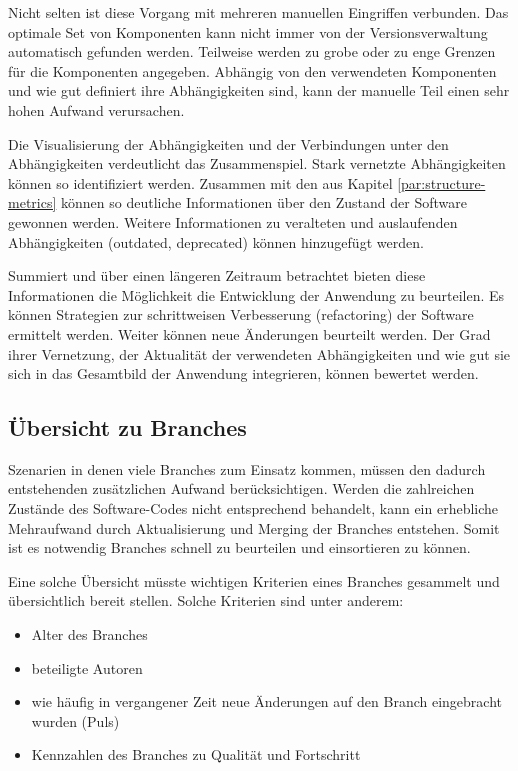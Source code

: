 Nicht selten ist diese Vorgang mit mehreren manuellen Eingriffen verbunden. Das optimale Set von Komponenten kann nicht immer von der Versionsverwaltung automatisch gefunden werden. Teilweise werden zu grobe oder zu enge Grenzen für die Komponenten angegeben. Abhängig von den verwendeten Komponenten und wie gut definiert ihre Abhängigkeiten sind, kann der manuelle Teil einen sehr hohen Aufwand verursachen.

Die Visualisierung der Abhängigkeiten und der Verbindungen unter den Abhängigkeiten verdeutlicht das Zusammenspiel. Stark vernetzte Abhängigkeiten können so identifiziert werden. Zusammen mit den  aus Kapitel \ref{par:structure-metrics} können so deutliche Informationen über den Zustand der Software gewonnen werden. Weitere Informationen zu veralteten und auslaufenden Abhängigkeiten (outdated, deprecated) können hinzugefügt werden.

Summiert und über einen längeren Zeitraum betrachtet bieten diese Informationen die Möglichkeit die Entwicklung der Anwendung zu beurteilen. Es können Strategien zur schrittweisen Verbesserung (refactoring) der Software ermittelt werden. Weiter können neue Änderungen beurteilt werden. Der Grad ihrer Vernetzung, der Aktualität der verwendeten Abhängigkeiten und wie gut sie sich in das Gesamtbild der Anwendung integrieren, können bewertet werden.

\subsection{Übersicht zu Branches}

Szenarien in denen viele Branches zum Einsatz kommen, müssen den dadurch entstehenden zusätzlichen Aufwand berücksichtigen. Werden die zahlreichen Zustände des Software-Codes nicht entsprechend behandelt, kann ein erhebliche Mehraufwand durch Aktualisierung und Merging der Branches entstehen. Somit ist es notwendig Branches schnell zu beurteilen und einsortieren zu können.

Eine solche Übersicht müsste wichtigen Kriterien eines Branches gesammelt und übersichtlich bereit stellen. Solche Kriterien sind unter anderem:
\begin{itemize}
\item Alter des Branches
\item beteiligte Autoren
\item wie häufig in vergangener Zeit neue Änderungen auf den Branch eingebracht wurden (Puls)
\item Kennzahlen des Branches zu Qualität und Fortschritt
\end{itemize}


